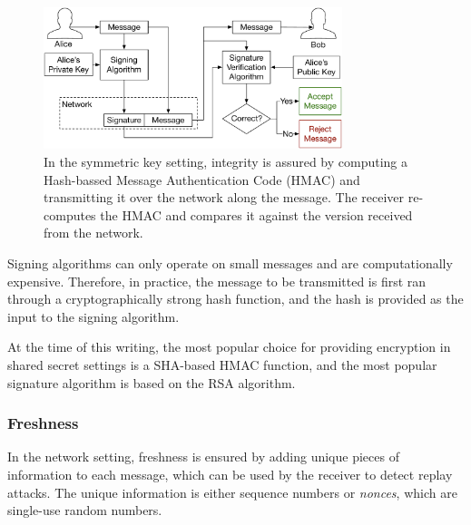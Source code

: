 \begin{figure}[hbt]
  \centering
  \includegraphics[width=87mm]{figures/asymmetric_signing.pdf}
  \caption{
    In the symmetric key setting, integrity is assured by computing a
    Hash-bassed Message Authentication Code (HMAC) and transmitting it over the
    network along the message. The receiver re-computes the HMAC and compares
    it against the version received from the network.
  }
  \label{fig:asymmetric_signing}
\end{figure}


Signing algorithms can only operate on small messages and are computationally
expensive. Therefore, in practice, the message to be transmitted is first ran
through a cryptographically strong hash function, and the hash is provided as
the input to the signing algorithm.

At the time of this writing, the most popular choice for providing encryption
in shared secret settings is a SHA-based HMAC function, and the most popular
signature algorithm is based on the RSA algorithm.


\subsubsection{Freshness}

In the network setting, freshness is ensured by adding unique pieces of
information to each message, which can be used by the receiver to detect replay
attacks. The unique information is either sequence numbers or \textit{nonces},
which are single-use random numbers.
